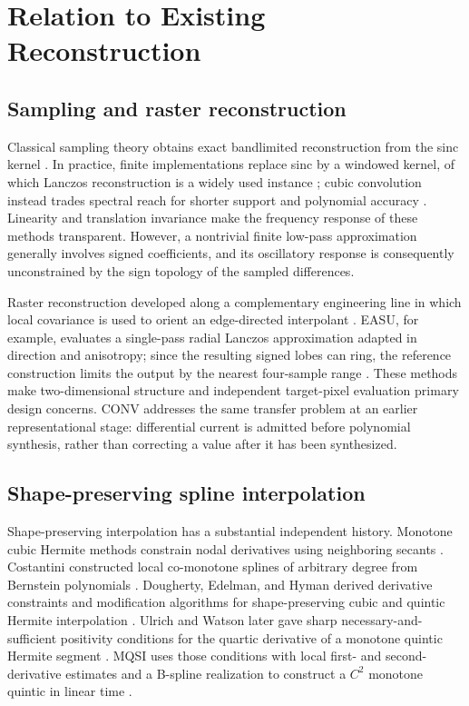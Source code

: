 \documentclass[journal]{IEEEtran}
\begin{document}
\section{Relation to Existing Reconstruction}

\subsection{Sampling and raster reconstruction}

Classical sampling theory obtains exact bandlimited reconstruction from the
sinc kernel \cite{shannon1949}. In practice, finite implementations replace
sinc by a windowed kernel, of which Lanczos reconstruction is a widely used
instance \cite{lanczos1956}; cubic convolution instead trades spectral reach
for shorter support and polynomial accuracy \cite{keys1981}. Linearity and
translation invariance make the frequency response of these methods
transparent. However, a nontrivial finite low-pass approximation generally
involves signed coefficients, and its oscillatory response is consequently
unconstrained by the sign topology of the sampled differences.

Raster reconstruction developed along a complementary engineering line in
which local covariance is used to orient an edge-directed interpolant
\cite{li2001}. EASU, for example, evaluates a single-pass radial Lanczos
approximation adapted in direction and anisotropy; since the resulting signed
lobes can ring, the reference construction limits the output by the nearest
four-sample range \cite{lottes2021}. These methods make two-dimensional
structure and independent target-pixel evaluation primary design concerns.
CONV addresses the same transfer problem at an earlier representational
stage: differential current is admitted before polynomial synthesis, rather
than correcting a value after it has been synthesized.

\subsection{Shape-preserving spline interpolation}

Shape-preserving interpolation has a substantial independent history.
Monotone cubic Hermite methods constrain nodal derivatives using neighboring
secants \cite{fritsch1980,hyman1983}. Costantini constructed local
co-monotone splines of arbitrary degree from Bernstein polynomials
\cite{costantini1987}. Dougherty, Edelman, and Hyman derived derivative
constraints and modification algorithms for shape-preserving cubic and
quintic Hermite interpolation \cite{dougherty1989}. Ulrich and Watson later
gave sharp necessary-and-sufficient positivity conditions for the quartic
derivative of a monotone quintic Hermite segment \cite{ulrich1994}. MQSI uses
those conditions with local first- and second-derivative estimates and a
B-spline realization to construct a \(C^2\) monotone quintic in linear time
\cite{lux2023}.
\end{document}
